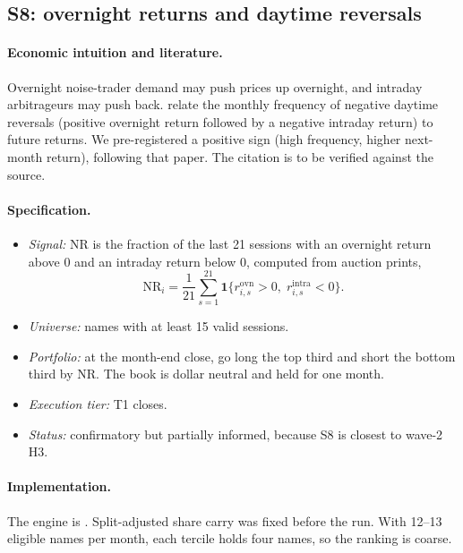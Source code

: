 \documentclass[../main.tex]{subfiles}
\begin{document}
\subsection{S8: overnight returns and daytime reversals}\label{sec:s8}

\paragraph{Economic intuition and literature.}
Overnight noise-trader demand may push prices up overnight, and intraday arbitrageurs may push back. \citet{akbas2022} relate the monthly frequency of negative daytime reversals (positive overnight return followed by a negative intraday return) to future returns. We pre-registered a positive sign (high frequency, higher next-month return), following that paper. The citation is to be verified against the source.

\paragraph{Specification.}
\begin{itemize}
\item \emph{Signal:} NR is the fraction of the last 21 sessions with an overnight return above 0 and an intraday return below 0, computed from auction prints,
\begin{equation}
\mathrm{NR}_{i} = \frac{1}{21}\sum_{s=1}^{21} \mathbf{1}\{r^{\mathrm{ovn}}_{i,s} > 0,\; r^{\mathrm{intra}}_{i,s} < 0\}.
\end{equation}
\item \emph{Universe:} names with at least 15 valid sessions.
\item \emph{Portfolio:} at the month-end close, go long the top third and short the bottom third by NR. The book is dollar neutral and held for one month.
\item \emph{Execution tier:} T1 closes.
\item \emph{Status:} confirmatory but partially informed, because S8 is closest to wave-2 H3.
\end{itemize}

\paragraph{Implementation.}
The engine is . Split-adjusted share carry was fixed before the run. With 12--13 eligible names per month, each tercile holds four names, so the ranking is coarse.
\end{document}
